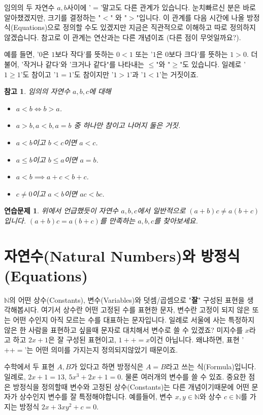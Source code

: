 \documentclass[a4paper, 11pt]{report}
\renewcommand{\<}{\langle}
\renewcommand{\>}{\rangle}
\newtheorem{remark}[thm]{참고}
\newtheorem{exercise}[thm]{연습문제}
\begin{document}
임의의 두 자연수 $a, b$사이에 '$=$'말고도 다른 관계가 있습니다.
눈치빠르신 분은 바로 알아챘겠지만, 크기를 결정하는 "$<$" 와 "$>$"입니다. 이 관계를 다음 시간에 나올 
방정식(Equations)으로 정의할 수도 있겠지만 지금은 직관적으로 이해하고 따로 정의하지 않겠습니다. 참고로
이 관계는 연산과는 다른 개념이죠 (다른 점이 무엇일까요?).

예를 들면, '$0$은 $1$보다 작다'를 뜻하는 $0 < 1$ 또는 '$1$은 $0$보다 크다'를 뜻하는 
$1 > 0$. 더불어, '작거나 같다'와 '크거나 같다"를 나타내는 $\le$"와 "$\ge$"도 있습니다. 
일례로 '$1 \ge 1$'도 참이고 '$1 = 1$'도 참이지만 '$1 > 1$'과 '$1 < 1$'는 거짓이죠.
\begin{remark}
  임의의 자연수 $a, b, c$에 대해 
  \begin{itemize}
    \item $a < b \iff b > a$.
    \item $a > b, a < b, a = b$ 중 하나만 참이고 나머지 둘은 거짓.
    \item $a < b$이고 $b < c$이면 $a < c$.
    \item $a \le b$이고 $b \le a$이면 $a = b$.
    \item $a < b \implies a + c < b + c$.
    \item $c \neq 0$이고 $a < b$이면 $ ac < bc$.
  \end{itemize}
\end{remark}
\begin{exercise}
  위에서 언급했듯이 자연수 $a, b, c$에서 일반적으로 $(a+b)c \neq a(b+c)$입니다. $(a+b)c = a(b+c)$를 
  만족하는 $a, b, c$를 찾아보세요. 
\end{exercise}

\section{자연수(Natural Numbers)와 방정식(Equations)}

$\mathbb{N}$의 어떤 상수(Constants), 변수(Variables)와 덧셈/곱셈으로 
"\textbf{잘}" 구성된 표현을 생각해봅시다. 여기서 상수란 어떤 고정된 수를 표현한 문자, 변수란 
고정이 되지 않은 또는 어떤 수인지 아직 모르는 수를 대표하는 문자입니다. 일례로 서울에 사는 특정하지 
않은 한 사람을 표현하고 싶을때 문자로 대치해서 변수로 쓸 수 있겠죠? 
미지수를 $x$라고 하고 $2x + 1$은 잘 구성된 표현이고, $1++=x$이건 아닙니다. 
왜냐하면, 표현 '$++=$'는 어떤 의미를 가지는지 정의되지않았기 때문이죠.

수학에서 두 표현 $A, B$가 있다고 하면 방정식은 $A = B$라고 쓰는 식(Formula)입니다. 
일례로, $2x + 1 = 13$, $5x^3 + 2x + 1 = 0$. 물론 여러개의 변수를 쓸 수 있죠. 
중요한 점은 방정식을 정의할때 변수와 고정된 상수(Constants)는 다른 개념이기때문에 
어떤 문자가 상수인지 변수를 잘 특정해야합니다. 예를들어, 변수 $x, y \in \mathbb{N}$와 
상수 $c \in \mathbb{N}$를 가지는 방정식 $2x + 3xy^2 + c = 0$.
\end{document}
